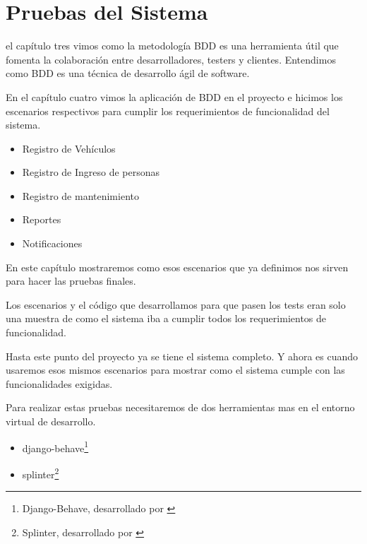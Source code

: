 \begin{savequote}[75mm]
\end{savequote}

\chapter{Pruebas del Sistema}

 el capítulo tres vimos como la metodología BDD es una herramienta útil que
fomenta la colaboración entre desarrolladores, testers y clientes. Entendimos
como BDD es una técnica de desarrollo ágil de software.

En el capítulo cuatro vimos la aplicación de BDD en el proyecto e hicimos los
escenarios respectivos para cumplir los requerimientos de funcionalidad del
sistema.

\begin{itemize}
    \item Registro de Vehículos
    \item Registro de Ingreso de personas
    \item Registro de mantenimiento
    \item Reportes
    \item Notificaciones
\end{itemize}

En este capítulo mostraremos como esos escenarios que ya definimos nos sirven
para hacer las pruebas finales.

Los escenarios y el código que desarrollamos para que pasen los tests eran solo
una muestra de como el sistema iba a cumplir todos los requerimientos de
funcionalidad.

Hasta este punto del proyecto ya se tiene el sistema completo. Y ahora es cuando
usaremos esos mismos escenarios para mostrar como el sistema cumple con las
funcionalidades exigidas.

Para realizar estas pruebas necesitaremos de dos herramientas mas en el
entorno virtual de desarrollo.

\begin{itemize}
  \item django-behave\footnote{Django-Behave, desarrollado por \citeauthor*{website:djangobehave}}
  \item splinter\footnote{Splinter, desarrollado por \citeauthor{website:splinter}}
\end{itemize}

